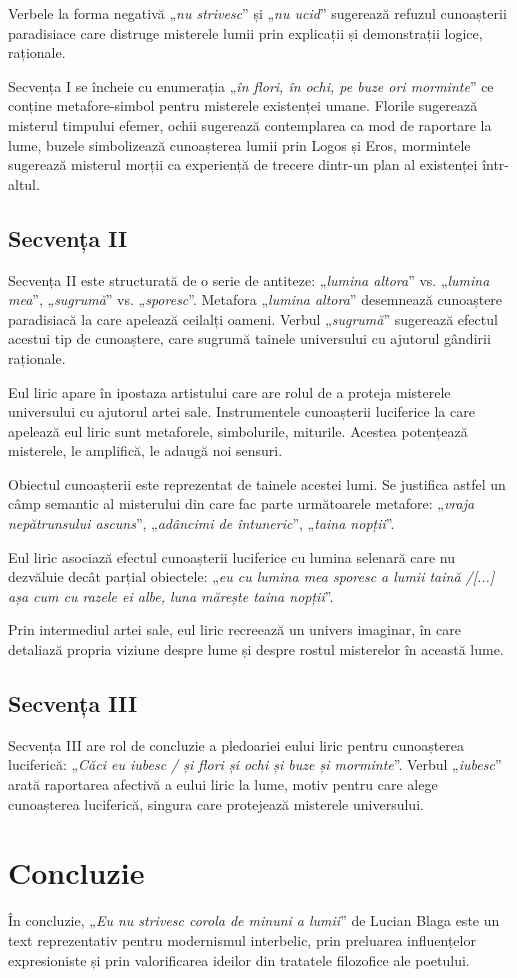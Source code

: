 \documentclass{article}
\newcommand{\qu}[1]{„\emph{#1}”}
\begin{document}
Verbele la forma negativă \qu{nu strivesc} și \qu{nu ucid} sugerează refuzul cunoașterii paradisiace care distruge misterele lumii prin explicații și demonstrații logice, raționale.

Secvența I se încheie cu enumerația \qu{în flori, în ochi, pe buze ori morminte} ce conține metafore-simbol pentru misterele existenței umane. Florile sugerează misterul timpului efemer, ochii sugerează contemplarea ca mod de raportare la lume, buzele simbolizează cunoașterea lumii prin Logos și Eros, mormintele sugerează misterul morții ca experiență de trecere dintr-un plan al existenței într-altul.

\subsection{Secvența II}
Secvența II este structurată de o serie de antiteze: \qu{lumina altora} vs. \qu{lumina mea}, \qu{sugrumă} vs. \qu{sporesc}. Metafora \qu{lumina altora} desemnează cunoaștere paradisiacă la care apelează ceilalți oameni. Verbul \qu{sugrumă} sugerează efectul acestui tip de cunoaștere, care sugrumă tainele universului cu ajutorul gândirii raționale.

Eul liric apare în ipostaza artistului care are rolul de a proteja misterele universului cu ajutorul artei sale. Instrumentele cunoașterii luciferice la care apelează eul liric sunt metaforele, simbolurile, miturile. Acestea potențează misterele, le amplifică, le adaugă noi sensuri.

Obiectul cunoașterii este reprezentat de tainele acestei lumi. Se justifica astfel un câmp semantic al misterului din care fac parte următoarele metafore: \qu{vraja nepătrunsului ascuns}, \qu{adâncimi de întuneric}, \qu{taina nopții}.

Eul liric asociază efectul cunoașterii luciferice cu lumina selenară care nu dezvăluie decât parțial obiectele: \qu{eu cu lumina mea sporesc a lumii taină /[...] așa cum cu razele ei albe, luna mărește taina nopții}.

Prin intermediul artei sale, eul liric recreează un univers imaginar, în care detaliază propria viziune despre lume și despre rostul misterelor în această lume.

\subsection{Secvența III}
Secvența III are rol de concluzie a pledoariei eului liric pentru cunoașterea luciferică: \qu{Căci eu iubesc / și flori și ochi și buze și morminte}. Verbul \qu{iubesc} arată raportarea afectivă a eului liric la lume, motiv pentru care alege cunoașterea luciferică, singura care protejează misterele universului.

\section{Concluzie}
În concluzie, \qu{Eu nu strivesc corola de minuni a lumii} de Lucian Blaga este un text reprezentativ pentru modernismul interbelic, prin preluarea influențelor expresioniste și prin valorificarea ideilor din tratatele filozofice ale poetului.
\end{document}
